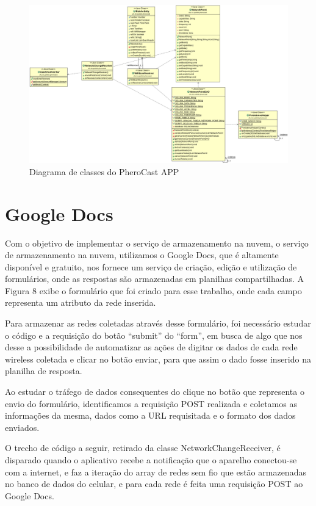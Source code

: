 \documentclass[12pt, %
openright, 
oneside,
a4paper,
brazil]{facom-ufu-abntex2}
\begin{document}
  \begin{figure}[hbt]
  \includegraphics [scale=.3] {diagrama}
  \caption{Diagrama de classes do PheroCast APP}
\end{figure}
  

 \section{Google Docs}
Com o objetivo de implementar o serviço de armazenamento na nuvem, o serviço de armazenamento na nuvem, utilizamos o Google Docs, que é altamente disponível e gratuito, nos fornece um serviço de criação, edição e utilização de formulários, onde as respostas são armazenadas em planilhas compartilhadas. A Figura 8 exibe o formulário que foi criado para esse trabalho, onde cada campo representa um atributo da rede inserida.

Para armazenar as redes coletadas através desse formulário, foi necessário estudar o código e a requisição do botão ``submit'' do ``form'', em busca de algo que nos desse a possibilidade de automatizar as ações de digitar os dados de cada rede wireless coletada e clicar no botão enviar, para que assim o dado fosse inserido na planilha de resposta.

Ao estudar o tráfego de dados consequentes do clique no botão que representa o envio do formulário, identificamos a requisição POST realizada e coletamos as informações da mesma, dados como a URL requisitada e o formato dos dados enviados. 

O trecho de código a seguir, retirado da classe NetworkChangeReceiver, é disparado quando o aplicativo recebe a notificação que o aparelho conectou-se com a internet, e faz a iteração do array de redes sem fio que estão armazenadas no banco de dados do celular, e para cada rede é feita uma requisição POST ao Google Docs.
\end{document}

